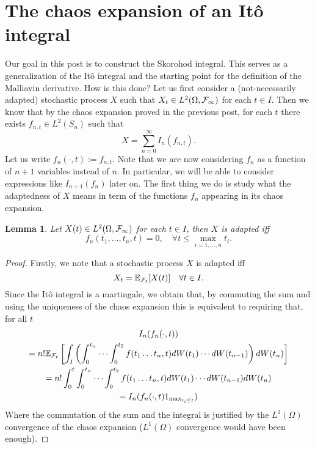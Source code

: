 \documentclass[12pt]{article}
\newtheorem{lemma}{Lemma}
\begin{document}
\section{The chaos expansion of an Itô integral}
Our goal in this post is to construct the Skorohod integral. This serves as a generalization of the Itô integral and the starting point for the definition of the Malliavin derivative. How is this done? Let us first consider a (not-necessarily adapted) stochastic process $X$ such that $X_t\in L^2(\Omega,\mathcal{F}_\infty)$ for each $t \in I$. Then we know that by the chaos expansion proved in the previous post, for each $t$ there exists  $f_{n,t}\in L^2(S_n)$ such that
\begin{equation*}
	X=\sum_{n=0}^{\infty} I_n(f_{n,t}).
\end{equation*}
Let us write $f_{n}(\cdot,t):=f_{n,t}$. Note that we are now considering $f_n$ as a function of $n+1$ variables instead of  $n$. In particular, we will be able to consider expressions like  $I_{n+1}(f_n)$ later on. The first thing we do is study what the adaptedness of $X$ means in term of the functions $f_n$ appearing in its chaos expansion.
\begin{lemma}
	Let $X(t) \in L^2(\Omega,\mathcal{F}_\infty)$ for each $t \in  I$, then $X$ is adapted iff
	\begin{equation*}
		f_n(t_1,\ldots,t_n,t)=0,\quad\forall t\leq\max_{i=1,\ldots,n} t_i .
	\end{equation*}
\end{lemma}
\begin{proof}
	Firstly, we note that a stochastic process $X$ is adapted iff $$X_t=\mathbb{E}_{\mathcal{F}_t}[X(t)]\quad\forall t\in I.$$ Since the Itô integral is a martingale, we obtain that, by commuting the sum and using the uniqueness of the chaos expansion this is equivalent to requiring that, for all $t$
	\begin{multline*}
		I_n(f_n(\cdot,t))\\=	n!\mathbb{E}_{\mathcal{F}_t} \left[\int_{I} \left( \int_{0}^{t_n}\cdots \int_{0}^{t_2}f(t_1\ldots t_n,t) dW(t_1) \cdots dW(t_{n-1}) \right)dW(t_n)\right]\\
		=n!\int_{0}^t \int_{0}^{t_n}\cdots \int_{0}^{t_2}f(t_1\ldots t_n,t) dW(t_1) \cdots dW(t_{n-1})dW(t_n)\\= I_n(f_n(\cdot,t) 1_{\max_{t_i\leq t}})
	\end{multline*}
	Where the commutation of the sum and the integral is justified by the $L^2(\Omega)$ convergence of the chaos expansion ($L^1(\Omega)$ convergence would have been enough).
\end{proof}
\end{document}
